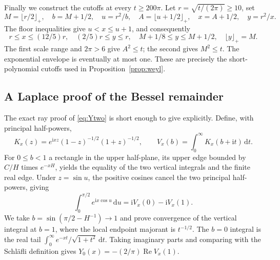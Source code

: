 \documentclass[11pt,a4paper]{article}
\numberwithin{equation}{section}
\theoremstyle{definition}
\newcommand{\dd}{\,\mathrm d}
\newcommand{\ii}{\mathrm i}
\newcommand{\Rea}{\operatorname{Re}}
\begin{document}
Finally we construct the cutoffs at every $t\ge200\pi$.
Let $r=\sqrt{t/(2\pi)}\ge10$, set
\[
 M=\lfloor r/2\rfloor_+,\quad b=M+1/2,\quad u=r^2/b,\quad
 A=\lfloor u+1/2\rfloor_+,\quad x=A+1/2,\quad y=r^2/x.
\]
The floor inequalities give $u<x\le u+1$, and consequently
\[
 r\le x\le(12/5)r,\quad(2/5)r\le y\le r,\quad
 M+1/8\le y\le M+1/2,\quad\lfloor y\rfloor_+=M.
\]
The first scale range and $2\pi>6$ give $A^2\le t$; the second gives
$M^2\le t$. The exponential envelope is eventually at most one.
These are precisely the short-polynomial cutoffs used in
Proposition~\ref{prop:weyl}.

\subsection{A Laplace proof of the Bessel remainder}
The exact ray proof of \eqref{eq:Ytwo} is short enough to give explicitly.
Define, with principal half-powers,
\[
 K_x(z)=e^{\ii xz}(1-z)^{-1/2}(1+z)^{-1/2},\qquad
 V_x(b)=\int_0^\infty K_x(b+\ii t)\dd t.
\]
For $0\le b<1$ a rectangle in the upper half-plane, its upper edge bounded by
$C/H$ times $e^{-xH}$, yields the equality of the two vertical integrals and
the finite real edge. Under $z=\sin u$, the positive cosines cancel the two
principal half-powers, giving
\[
 \int_0^{\pi/2}e^{\ii x\cos u}\dd u=\ii V_x(0)-\ii V_x(1).
\]
We take $b=\sin(\pi/2-H^{-1})\to1$ and prove convergence of the
vertical integral at $b=1$, where the local endpoint majorant is $t^{-1/2}$.
The $b=0$ integral is the real tail
$\int_0^\infty e^{-xt}/\sqrt{1+t^2}\dd t$.
Taking imaginary parts and comparing with the Schl\"afli definition gives
$Y_0(x)=-(2/\pi)\Rea V_x(1)$.
\end{document}
